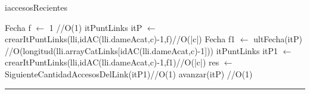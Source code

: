 \begin{algorithm}[H]
\caption{iaccesosRecientes}
\begin{algorithmic}[1]
\state Fecha f $\gets$ 1 \hfill//O(1)
\state itPuntLinks itP $\gets$ crearItPuntLinks(lli,idAC(lli.dameAcat,c)-1,f)\hfill//O(|c|)
\state Fecha f1 $\gets$ ultFecha(itP) \hfill //O(longitud(lli.arrayCatLinks[idAC(lli.dameAcat,c)-1]))
\state itPuntLinks itP1 $\gets$ crearItPuntLinks(lli,idAC(lli.dameAcat,c)-1,f1)\hfill//O(|c|)
\state res $\gets$ SiguienteCantidadAccesosDelLink(itP1)\hfill//O(1)
\endif
\state avanzar(itP) \hfill//O(1)
\endwhile
\EndFunction 
\end{algorithmic}
\hrule
{}
\end{algorithm}